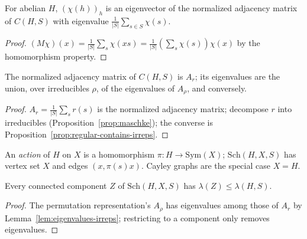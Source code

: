 \begin{proposition}
  \label{prop:character-eigenvector}
  For abelian $H$, $(\chi(h))_{h}$ is an eigenvector of the normalized adjacency
  matrix of $C(H,S)$ with eigenvalue $\tfrac1{|S|}\sum_{s\in S}\chi(s)$.
\end{proposition}
\begin{proof}
  $(M\chi)(x)=\tfrac1{|S|}\sum_s\chi(xs)=\tfrac1{|S|}(\sum_s\chi(s))\chi(x)$ by
  the homomorphism property.
\end{proof}

\begin{lemma}
  \label{lem:eigenvalues-irreps}
  The normalized adjacency matrix of $C(H,S)$ is $A_r$; its eigenvalues are the
  union, over irreducibles $\rho$, of the eigenvalues of $A_\rho$, and
  conversely.
\end{lemma}
\begin{proof}
  $A_r=\tfrac1{|S|}\sum_sr(s)$ is the normalized adjacency matrix; decompose $r$
  into irreducibles (Proposition~\ref{prop:maschke}); the converse is
  Proposition~\ref{prop:regular-contains-irreps}.
\end{proof}

\begin{definition}
  \label{def:schreier-graph}
  An \emph{action} of $H$ on $X$ is a homomorphism $\pi:H\to\mathrm{Sym}(X)$;
  $\mathrm{Sch}(H,X,S)$ has vertex set $X$ and edges $(x,\pi(s)x)$. Cayley graphs
  are the special case $X=H$.
\end{definition}

\begin{proposition}
  \label{prop:schreier-component}
  Every connected component $Z$ of $\mathrm{Sch}(H,X,S)$ has
  $\lambda(Z)\le\lambda(H,S)$.
\end{proposition}
\begin{proof}
  The permutation representation's $A_\rho$ has eigenvalues among those of $A_r$
  by Lemma~\ref{lem:eigenvalues-irreps}; restricting to a component only removes
  eigenvalues.
\end{proof}

